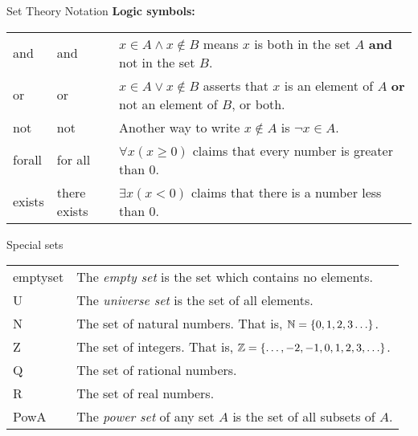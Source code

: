 \documentclass[12pt]{article}
\begin{document}
\begin{defbox}{Set Theory Notation}
\noindent\textbf{Logic symbols:}\\
\noindent  \begin{tabular}{p{.65in} p{1.35in} p{3.1in}}

    \gls{and} & and & $x \in A \wedge x \notin B$ means $x$ is both in the set $A$ \textbf{and} not in the set $B$. \\[.5ex]
    \gls{or} & or & $x \in A \vee x \notin B$ asserts that $x$ is an element of $A$ \textbf{or} not an element of $B$, or both. \\[.5ex]
    \gls{not} & not & Another way to write $x \notin A$ is $\neg x \in A$.\\[.5ex]
    \gls{forall} & for all & $\forall x (x \ge 0)$ claims that every number is greater than 0.\index{universal quantifier} \\[.5ex]
    \gls{exists} & there exists\index{existential quantifier} & $\exists x (x < 0)$ claims that there is a number less than 0.
  \end{tabular}

\end{defbox}

\begin{defbox}{Special sets}

\begin{tabular}{l p{4.75in}}
  \gls{emptyset} & The \emph{empty set}\index{empty set} is the set which contains no elements.\\[1ex]
  \gls{U} & The \emph{universe set} is the set of all elements.\\[1ex]
\gls{N} & The set of natural numbers\index{natural numbers}. That is, $\mathbb N = \{0, 1, 2, 3\ldots\}$. \\[1ex]
\gls{Z} & The set of integers\index{integers}.  That is, $\mathbb Z = \{\ldots, -2, -1, 0, 1, 2, 3, \ldots\}$.\\[1ex]
\gls{Q} & The set of rational numbers\index{rationals}.\\[1ex]
\gls{R} & The set of real numbers\index{reals}.\\[1ex]
\gls{PowA} & The \emph{power set}\index{power set} of any set $A$ is the set of all subsets of $A$.
\end{tabular}
\end{defbox}
\end{document}
